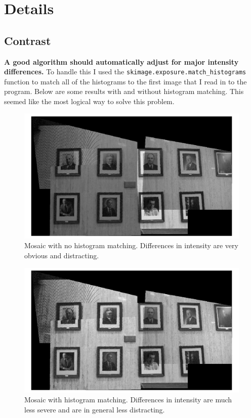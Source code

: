 \documentclass[]{article}
\begin{document}
\section{Details}
	\subsection{Contrast}
	\label{contrast}
	\textbf{A good algorithm should automatically adjust for major intensity differences.}
	\vskip 10pt
	To handle this I used the \texttt{skimage.exposure.match\_histograms} function to match all of the histograms to the first image that I read in to the program. Below are some results with and without histogram matching. This seemed like the most logical way to solve this problem.
	
	\begin{figure}[H]
		\centering
		\includegraphics[width=6.5in]{test_images/no_hist_match.png}
		\caption{Mosaic with no histogram matching. Differences in intensity are very obvious and distracting.}
	\end{figure}
	
	\begin{figure}[H]
		\centering
		\includegraphics[width=6.5in]{test_images/hist_match.png}
		\caption{Mosaic with histogram matching. Differences in intensity are much less severe and are in general less distracting.}
	\end{figure}
	
\end{document}
